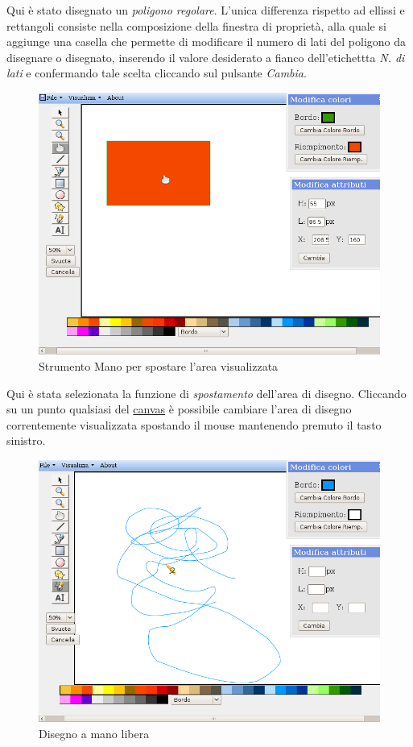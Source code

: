  
\vspace{300pt}
Qui \`e stato disegnato un \textit{poligono regolare}. L'unica differenza rispetto ad ellissi e rettangoli consiste nella composizione della finestra di propriet\`a, alla quale si aggiunge una casella che permette di modificare il numero di lati del poligono da disegnare o disegnato, inserendo il valore desiderato a fianco dell'etichettta \textit{N. di lati} e confermando tale scelta cliccando sul pulsante \textit{Cambia}.
 
 
\newpage
 
 
\begin{figure}[!ht]
\centering
\includegraphics[scale=0.5]{images/mano.png}
\caption{Strumento Mano per spostare l'area visualizzata}
\end{figure}
 
 
\vspace{100pt}
Qui \`e stata selezionata la funzione di \textit{spostamento} dell'area di disegno. Cliccando su un punto qualsiasi del \underline{canvas} \`e possibile cambiare l'area di disegno correntemente visualizzata spostando il mouse mantenendo premuto il tasto sinistro.
\newpage
 
 
\begin{figure}[!ht]
\centering
\includegraphics[scale=0.5]{images/matita.png}
\caption{Disegno a mano libera}
\end{figure}
 
